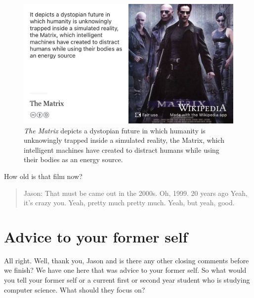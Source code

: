 \documentclass[
]{book}
\begin{document}
\begin{figure}

{\centering \includegraphics[width=1\linewidth]{images/the-matrix} 

}

\caption{\emph{The Matrix} depicts a dystopian future in which humanity is unknowingly trapped inside a simulated reality, the Matrix, which intelligent machines have created to distract humans while using their bodies as an energy source. \citep{thematrix}}\label{fig:matrix-fig}
\end{figure}



How old is that film now?

\begin{quote}
Jason: That must be came out in the 2000s. Oh, 1999. 20 years ago Yeah, it's crazy you. Yeah, pretty much pretty much. Yeah, but yeah, good.
\end{quote}

\hypertarget{jselfie}{%
\section{Advice to your former self}\label{jselfie}}

All right. Well, thank you, Jason and is there any other closing comments before we finish? We have one here that was advice to your former self. So what would you tell your former self or a current first or second year student who is studying computer science. What should they focus on?
\end{document}
